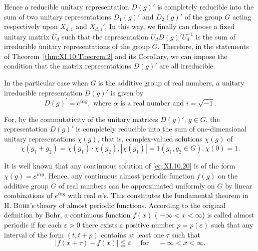 Hence a reducible unitary representation $D(g)'$ is completely reducible into the sum of two unitary representations $D_1(g)'$ and $D_2(g)'$ of the group $G$ acting respectively upon $X_{d,1}$ and $X_{d,1}'$. In this way, we finally can choose a fixed unitary matrix $U_d$ such that the representation $U_dD(g)'U_d^{-1}$ is the sum of irreducible unitary representations of the group $G$. Therefore, in the statements of Theorem~\ref{thm:XI.10.Theorem.2} and its Corollary, we can impose the condition that the matrix representations $D(g)'$ are all irreducible. 

\begin{remarkn}[Remark $2$] In the particular case when $G$ is the additive group of real numbers, a unitary irreducible representation $D(g)'$ is given by 
\begin{equation}\label{eq:XI.10.19}
D (g) ^{\prime} = e ^{i \alpha g}, \text{ where } \alpha \text{ is a real number and } i = \sqrt {- 1}.
\end{equation}
\end{remarkn}

For, by the commutativity of the unitary matrices $D(g)'$, $g \in G$, the representation $D(g)'$ is completely reducible into the sum of one-dimensional unitary representations $\chi(g)$, that is, complex-valued solutions $\chi(g)$ of 
\begin{equation}\label{eq:XI.10.20}
\chi \left(g _{1} + g _{2}\right) = \chi \left(g _{1}\right) \cdot \chi \left(g _{2}\right), | \chi (g _{1}) | = 1 (g _{1}, g _{2} \in G), \chi (0) = 1.
\end{equation}

It is well known that any continuous solution of \eqref{eq:XI.10.20} is of the form $\chi(g) = e^{i\alpha g}$. Hence, any continuous almost periodic function $f(g)$ on the additive group $G$ of real numbers can be approximated uniformly on $G$ by linear combinations of $e^{i\alpha g}$ with real $\alpha$'s. This constitutes the fundamental theorem in H. \textsc{Bohr}'s theory of almost periodic functions. According to the original definition by Bohr, a continuous function $f(x)$ ( $-\infty < x < \infty$) is called almost periodic if for each $\varepsilon > 0$ there exists a positive number $p = p(\varepsilon)$ such that any interval of the form $(t, t + p)$ contains at least one $\tau$ such that 
\[
\left| f (x + \tau) - f (x) \right| \leqq \varepsilon \quad \text{ for } \quad - \infty < x < \infty .
\]

